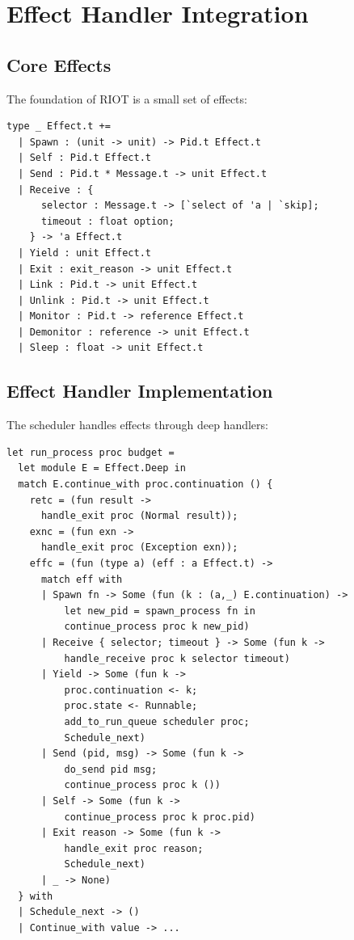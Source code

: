 \documentclass[12pt,a4paper]{report}
\begin{document}
\section{Effect Handler Integration}

\subsection{Core Effects}

The foundation of RIOT is a small set of effects:

\begin{lstlisting}
type _ Effect.t +=
  | Spawn : (unit -> unit) -> Pid.t Effect.t
  | Self : Pid.t Effect.t
  | Send : Pid.t * Message.t -> unit Effect.t
  | Receive : {
      selector : Message.t -> [`select of 'a | `skip];
      timeout : float option;
    } -> 'a Effect.t
  | Yield : unit Effect.t
  | Exit : exit_reason -> unit Effect.t
  | Link : Pid.t -> unit Effect.t
  | Unlink : Pid.t -> unit Effect.t
  | Monitor : Pid.t -> reference Effect.t
  | Demonitor : reference -> unit Effect.t
  | Sleep : float -> unit Effect.t
\end{lstlisting}

\subsection{Effect Handler Implementation}

The scheduler handles effects through deep handlers:

\begin{lstlisting}
let run_process proc budget =
  let module E = Effect.Deep in
  match E.continue_with proc.continuation () {
    retc = (fun result -> 
      handle_exit proc (Normal result));
    exnc = (fun exn ->
      handle_exit proc (Exception exn));
    effc = (fun (type a) (eff : a Effect.t) ->
      match eff with
      | Spawn fn -> Some (fun (k : (a,_) E.continuation) ->
          let new_pid = spawn_process fn in
          continue_process proc k new_pid)
      | Receive { selector; timeout } -> Some (fun k ->
          handle_receive proc k selector timeout)
      | Yield -> Some (fun k ->
          proc.continuation <- k;
          proc.state <- Runnable;
          add_to_run_queue scheduler proc;
          Schedule_next)
      | Send (pid, msg) -> Some (fun k ->
          do_send pid msg;
          continue_process proc k ())
      | Self -> Some (fun k ->
          continue_process proc k proc.pid)
      | Exit reason -> Some (fun k ->
          handle_exit proc reason;
          Schedule_next)
      | _ -> None)
  } with
  | Schedule_next -> ()
  | Continue_with value -> ...
\end{lstlisting}
\end{document}
